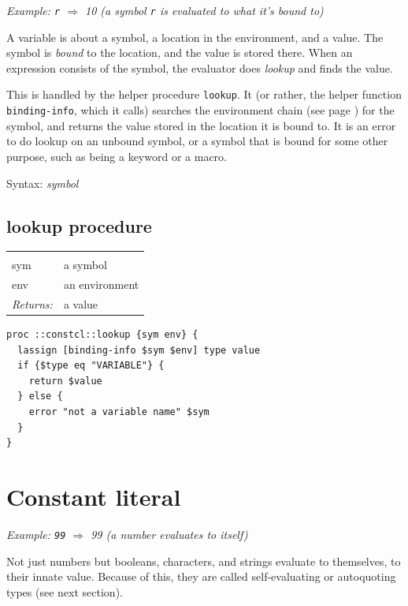 \documentclass[a5paper,draft]{memoir}
\begin{document}
\emph{Example: \texttt{r} $\Rightarrow$ 10 (a symbol \texttt{r} is evaluated to what it's bound to)}

A variable is about a symbol, a location in the environment, and a value. The symbol is \emph{bound} to the location, and the value is stored there. When an expression consists of the symbol, the evaluator does \emph{lookup} and finds the value.

This is handled by the helper procedure \texttt{lookup}. It (or rather, the helper function \texttt{binding-info}, which it calls) searches the environment chain (see page \pageref{environments}) for the symbol, and returns the value stored in the location it is bound to. It is an error to do lookup on an unbound symbol, or a symbol that is bound for some other purpose, such as being a keyword or a macro.

Syntax: \emph{symbol}

\subsection{lookup procedure}
\label{lookup-procedure}

\noindent\begin{tabular}{ |p{1.9cm} p{6.5cm}| }
\hline
\rowcolor[HTML]{CCCCCC} \multicolumn{2}{|l|}{\textbf{lookup (internal)}} \\
sym & a symbol \\
env & an environment \\
\textit{Returns:} & a value \\
\hline
\end{tabular}

\begin{lstlisting}
proc ::constcl::lookup {sym env} {
  lassign [binding-info $sym $env] type value
  if {$type eq "VARIABLE"} {
    return $value
  } else {
    error "not a variable name" $sym
  }
}
\end{lstlisting}

\section{Constant literal}
\label{constant-literal}

\emph{Example: \texttt{99} $\Rightarrow$ 99 (a number evaluates to itself)}

Not just numbers but booleans, characters, and strings evaluate to themselves, to their innate value. Because of this, they are called self-evaluating or autoquoting types (see next section).
\end{document}
